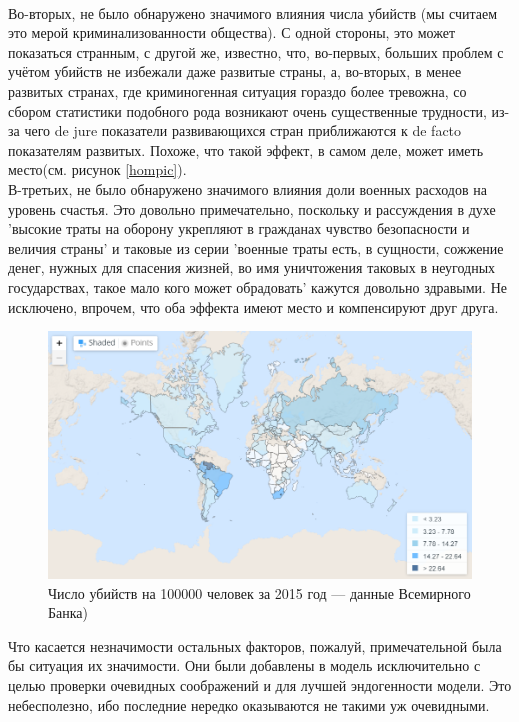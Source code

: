 \documentclass[russian]{vegareport}
\begin{document}
        \\
        Во-вторых, не было обнаружено значимого влияния числа убийств (мы считаем это мерой криминализованности общества). С одной стороны, это может показаться странным, с другой же, известно, что, во-первых, больших проблем с учётом убийств не избежали даже развитые страны, а, во-вторых, в менее развитых странах, где криминогенная ситуация гораздо более тревожна, со сбором статистики подобного рода возникают очень существенные трудности, из-за чего de jure показатели развивающихся стран приближаются к de facto показателям развитых. Похоже, что такой эффект, в самом деле, может иметь место(см. рисунок \ref{hompic}).
        \\
        В-третьих, не было обнаружено значимого влияния доли военных расходов на уровень счастья. Это довольно примечательно, поскольку и рассуждения в духе 'высокие траты на оборону укрепляют в гражданах чувство безопасности и величия страны' и таковые из серии 'военные траты есть, в сущности, сожжение денег, нужных для спасения жизней, во имя уничтожения таковых в неугодных государствах, такое мало кого может обрадовать' кажутся довольно здравыми. Не исключено, впрочем, что оба эффекта имеют место и компенсируют друг друга. 
        \\
                \begin{figure} \label{hompic}	
            \centering
            \includegraphics[scale=0.45]{Report/homicides.png}
		\caption{Число убийств на 100000 человек за 2015 год --- данные Всемирного Банка)}
            \label{lect02:pic1}
	\end{figure}
        Что касается незначимости остальных факторов, пожалуй, примечательной была бы ситуация их значимости. Они были добавлены в модель исключительно с целью проверки очевидных соображений и для лучшей эндогенности модели. Это небесполезно, ибо последние нередко оказываются не такими уж очевидными.
\end{document}
